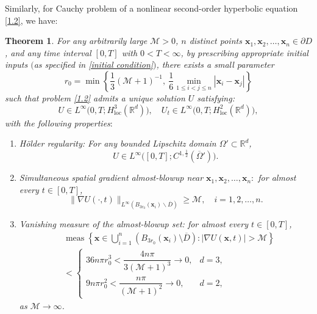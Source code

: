 \documentclass[11pt,reqno,oneside]{amsart}
\numberwithin{equation}{section}
\newtheorem{theorem}{Theorem}[section]
\theoremstyle{definition}
\theoremstyle{remark}
\numberwithin{equation}{section}
\begin{document}
	Similarly, for Cauchy problem of a nonlinear second-order hyperbolic equation \eqref{1.2}, we have:
	\begin{theorem}\label{thm:main2}
		For any arbitrarily large $\mathcal{M} > 0$, $n$ distinct points $\mathbf{x}_1,\mathbf{x}_2,\ldots,\mathbf{x}_n \in \partial D$, and any time interval $[0,T]$ with $0 < T < \infty$, by prescribing appropriate initial inputs $($as specified in \eqref{initial condition}$)$, there exists a small parameter
		$$
		r_0  = \min\left\{\frac{1}{3}(\mathcal{M} + 1)^{-1},\  \frac{1}{6}\min_{1 \leq i < j \leq n} |\mathbf{x}_i - \mathbf{x}_j|\right\}
		$$
		such that problem \eqref{1.2} admits a unique solution $U$ satisfying:
		$$
		U \in L^{\infty}\big(0,T;H^{3}_{\mathrm{loc}}(\mathbb{R}^d)\big), \quad 
		U_t \in L^{\infty}\big(0,T;H^{2}_{\mathrm{loc}}(\mathbb{R}^d)\big),
		$$
		with the following properties$:$
		\begin{enumerate}
			\item \textit{H\"older regularity}: For any bounded Lipschitz domain $\Omega' \subset \mathbb{R}^d$,
			$$
			U \in L^{\infty}\big([0,T]; C^{1,\frac{1}{2}}(\overline{\Omega}')\big).
			$$
			
			\item Simultaneous spatial gradient almost-blowup near $\mathbf{x}_1,\mathbf{x}_2,\dots,\mathbf{x}_n:$ for almost every $t \in [0,T]$,
			$$
			\|\nabla U(\cdot,t)\|_{L^{\infty} (B_{3r_0}(\mathbf{x}_i) \backslash \overline{D})} \geq \mathcal{M}, \quad i=1,2,\dots,n.
			$$
			
			\item Vanishing measure of the almost-blowup set: 
			for almost every $t \in [0,T]$,
			\begin{equation*}
				\begin{aligned}
					&\operatorname{meas}\left\{ \mathbf{x} \in \bigcup_{i=1}^{n} \left(B_{3r_0}(\mathbf{x}_i)\setminus \overline{D}\right) : |\nabla U(\mathbf{x},t)| > \mathcal{M} \right\}\\
					&	< \begin{cases}
						36n\pi r_0^3 < \dfrac{4n\pi}{3(\mathcal{M} + 1)^3} \to 0,&d=3, \\
						9n\pi r_0^2 < \dfrac{n\pi}{(\mathcal{M}+1)^2} \to 0,&d=2,
					\end{cases}
				\end{aligned}
			\end{equation*}
			as $\mathcal{M} \to \infty$.
		\end{enumerate}
	\end{theorem}
	
\end{document}
